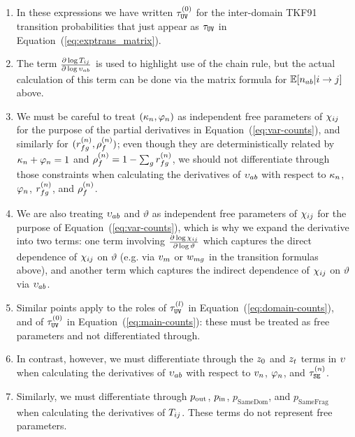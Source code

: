 \begin{enumerate}
  \item In these expressions we have written $\tau^{(0)}_{{\tt U}{\tt V}}$ for the inter-domain TKF91 transition probabilities that just appear as $\tau_{{\tt U}{\tt V}}$ in Equation~(\ref{eq:exptrans_matrix}).
  \item The term $\frac{\partial \log T_{ij}}{\partial \log \upsilon_{ab}}$ is used to highlight use of the chain rule, but the actual calculation of this term can be done via the matrix formula for $\mathbb{E}[n_{ab}|i \to j]$ above.
  \item We must be careful to treat $(\kappa_n,\varphi_n)$ as independent free parameters of $\chi_{ij}$ for the purpose of the partial derivatives in Equation~(\ref{eq:var-counts}), and similarly for $(r^{(n)}_{fg},\rho^{(n)}_f)$;
even though they are deterministically related by $\kappa_n + \varphi_n = 1$ and $\rho^{(n)}_f = 1 - \sum_g r^{(n)}_{fg}$, we should not differentiate through those constraints when calculating the derivatives of $\upsilon_{ab}$ with respect to $\kappa_n$, $\varphi_n$, $r^{(n)}_{fg}$, and $\rho^{(n)}_f$.
  \item We are also treating $\upsilon_{ab}$ and $\vartheta$ as independent free parameters of $\chi_{ij}$ for the purpose of Equation~(\ref{eq:var-counts}), which is why we expand the derivative into two terms: one term involving $\frac{\partial \log \chi_{ij}}{\partial \log \vartheta}$ which captures the direct dependence of $\chi_{ij}$ on $\vartheta$ (e.g. via $v_m$ or $w_{mg}$ in the transition formulas above), and another term which captures the indirect dependence of $\chi_{ij}$ on $\vartheta$ via $\upsilon_{ab}$.
  \item Similar points apply to the roles of $\tau^{(l)}_{{\tt U}{\tt V}}$ in Equation~(\ref{eq:domain-counts}), and of $\tau^{(0)}_{{\tt U}{\tt V}}$ in Equation~(\ref{eq:main-counts}): these must be treated as free parameters and not differentiated through.
  \item In contrast, however, we must differentiate through the $z_0$ and $z_t$ terms in $\upsilon$ when calculating the derivatives of $\upsilon_{ab}$ with respect to $v_n$, $\varphi_n$, and $\tau^{(n)}_{{\tt S}{\tt E}}$.
  \item Similarly, we must differentiate through $p_\mathrm{out}$, $p_\mathrm{in}$, $p_\text{SameDom}$, and $p_\text{SameFrag}$ when calculating the derivatives of $T_{ij}$. These terms do not represent free parameters.
\end{enumerate}


